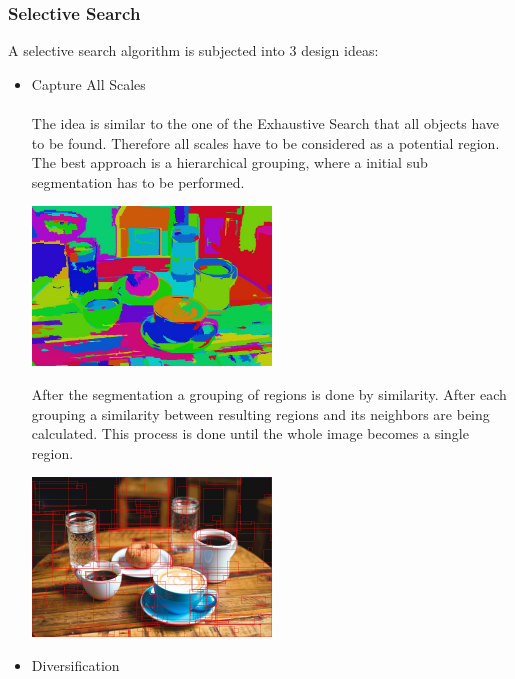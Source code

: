 \subsubsection{Selective Search}
A selective search algorithm is subjected into 3 design ideas:\\
\begin{itemize}
    \item Capture All Scales \\ \\
        The idea is similar to the one of the Exhaustive Search that all objects have to be found. Therefore all scales have to be
        considered as a potential region. The best approach is a hierarchical grouping, where a initial sub segmentation has to
        be performed. \cite{selectivesearch}
        \begin{center}
            \includegraphics[width=0.5\textwidth]{images/object_detection/breakfast_fnh.jpg}\cite{sssegmentationc}
        \end{center}
        After the segmentation a grouping of regions is done by similarity. After each grouping a similarity between
        resulting regions and its neighbors are being calculated. This process is done until the whole image becomes a single region.\cite{selectivesearch}
        \begin{center}
            \includegraphics[width=0.5\textwidth]{images/object_detection/breakfast-top-200-proposals.jpg}\cite{sssegmentationbb}
        \end{center}
    \item Diversification \\ \\

\end{itemize}
